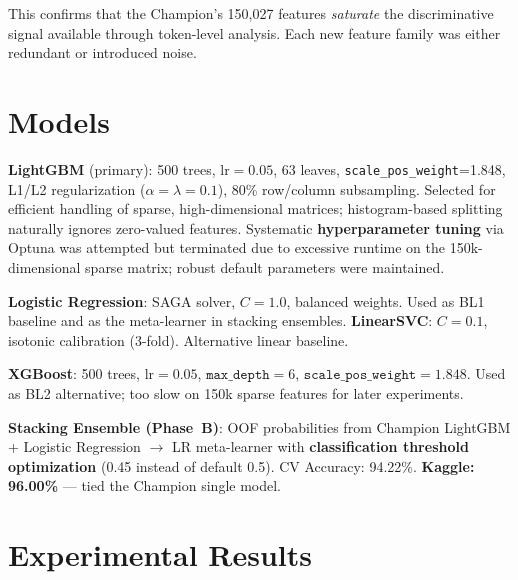\documentclass[11pt]{article}
\begin{document}
This confirms that the Champion's 150,027 features \textit{saturate} the discriminative signal available through token-level analysis. Each new feature family was either redundant or introduced noise.

\section{Models}

\textbf{LightGBM} (primary): 500 trees, $\text{lr}{=}0.05$, 63 leaves, \texttt{scale\_pos\_weight}{=}1.848, L1/L2 regularization ($\alpha{=}\lambda{=}0.1$), 80\% row/column subsampling. Selected for efficient handling of sparse, high-dimensional matrices; histogram-based splitting naturally ignores zero-valued features. Systematic \textbf{hyperparameter tuning} via Optuna was attempted but terminated due to excessive runtime on the 150k-dimensional sparse matrix; robust default parameters were maintained.

\textbf{Logistic Regression}: SAGA solver, $C{=}1.0$, balanced weights. Used as BL1 baseline and as the meta-learner in stacking ensembles.
\textbf{LinearSVC}: $C{=}0.1$, isotonic calibration (3-fold). Alternative linear baseline.

\textbf{XGBoost}: 500 trees, $\text{lr}{=}0.05$, $\texttt{max\_depth}{=}6$, $\texttt{scale\_pos\_weight}{=}1.848$. Used as BL2 alternative; too slow on 150k sparse features for later experiments.

\textbf{Stacking Ensemble (Phase~B)}: OOF probabilities from Champion LightGBM + Logistic Regression $\to$ LR meta-learner with \textbf{classification threshold optimization} (0.45 instead of default 0.5). CV Accuracy: 94.22\%. \textbf{Kaggle: 96.00\%} --- tied the Champion single model.

\section{Experimental Results}
\end{document}

